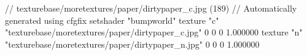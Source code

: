 // texturebase/moretextures/paper/dirtypaper_c.jpg (189)
// Automatically generated using cfgfix
setshader "bumpworld"
texture "c" "texturebase/moretextures/paper/dirtypaper_c.jpg" 0 0 0 1.000000
texture "n" "texturebase/moretextures/paper/dirtypaper_n.jpg" 0 0 0 1.000000

